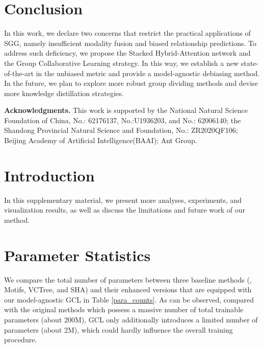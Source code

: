 \documentclass[10pt,twocolumn,letterpaper]{article}
\begin{document}
\section{Conclusion}



In this work, we declare two concerns that restrict the practical applications of SGG, namely insufficient modality fusion and biased relationship predictions. To address such deficiency, we propose the Stacked Hybrid-Attention network and the Group Collaborative Learning strategy. In this way, we establish a new state-of-the-art in the unbiased metric and provide a model-agnostic debiasing method. In the future, we plan to explore more robust group dividing methods and devise more knowledge distillation strategies.

\setlength{\parskip}{8pt}
\noindent\textbf{Acknowledgments.} This work is supported by the National Natural Science Foundation of China, No.: 62176137, No.:U1936203, and No.: 62006140; the Shandong Provincial Natural Science and Foundation, No.: ZR2020QF106; Beijing Academy of Artificial Intelligence(BAAI); Ant Group.
\setlength{\parskip}{0pt}

\newpage
{\small


}

\newpage

\setcounter{section}{0}

\setlength{\parskip}{0pt}
\section{Introduction}

In this supplementary material, we present more analyses, experiments, and visualization results, as well as discuss the limitations and future work of our method.

\section{Parameter Statistics}
We compare the total number of parameters between three baseline methods (\ie, Motifs, VCTree, and SHA) and their enhanced versions that are equipped with our model-agnostic GCL in Table \ref{para_counts}. As can be observed, compared with the original methods which possess a massive number of total trainable parameters (about 200M), GCL only additionally introduces a limited number of parameters (about 2M), which could hardly influence the overall training procedure.
\end{document}
